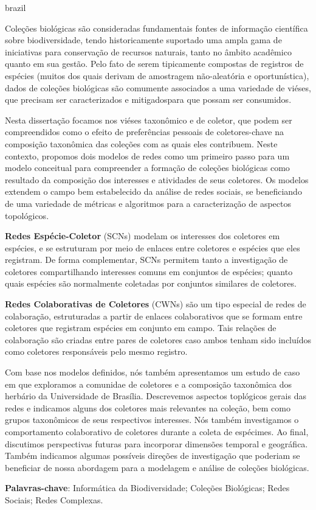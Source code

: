 \documentclass[
	12pt,				%
	openright,			%
	oneside,			%
	a4paper,			%
	sumario=tradicional,%
	french,				%
	spanish,			%
	brazil,				%
    english
	]{abntex2}
\begin{document}
\begin{resumo}[Resumo]
 \begin{otherlanguage*}{brazil}
 \begin{small}
Coleções biológicas são consideradas fundamentais fontes de informação científica sobre biodiversidade, tendo historicamente suportado uma ampla gama de iniciativas para conservação de recursos naturais, tanto no âmbito acadêmico quanto em sua gestão.
Pelo fato de serem tipicamente compostas de registros de espécies (muitos dos quais derivam de amostragem não-aleatória e oportunística), dados de coleções biológicas são comumente associados a uma variedade de viéses, que precisam ser caracterizados e mitigadospara que possam ser consumidos.

Nesta dissertação focamos nos viéses taxonômico e de coletor, que podem ser compreendidos como o efeito de preferências pessoais de coletores-chave na composição taxonômica das coleções com as quais eles contribuem.
Neste contexto, propomos dois modelos de redes como um primeiro passo para um modelo conceitual para compreender a formação de coleções biológicas como resultado da composição dos interesses e atividades de seus coletores.
Os modelos extendem o campo bem estabelecido da análise de redes sociais, se beneficiando de uma variedade de métricas e algoritmos para a caracterização de aspectos topológicos.

\textbf{Redes Espécie-Coletor} (SCNs) modelam os interesses dos coletores em espécies, e se estruturam por meio de enlaces entre coletores e espécies que eles registram.
De forma complementar, SCNs permitem tanto a investigação de coletores compartilhando interesses comuns em conjuntos de espécies; quanto quais espécies são normalmente coletadas por conjuntos similares de coletores.

\textbf{Redes Colaborativas de Coletores} (CWNs) são um tipo especial de redes de colaboração, estruturadas a partir de enlaces colaborativos que se formam entre coletores que registram espécies em conjunto em campo.
Tais relações de colaboração são criadas entre pares de coletores caso ambos tenham sido incluídos como coletores responsáveis pelo mesmo registro.

Com base nos modelos definidos, nós também apresentamos um estudo de caso em que exploramos a comunidae de coletores e a composição taxonômica dos herbário da Universidade de Brasília.
Descrevemos aspectos toplógicos gerais das redes e indicamos alguns dos coletores mais relevantes na coleção, bem como grupos taxonômicos de seus respectivos interesses.
Nós também investigamos o comportamento colaborativo de coletores durante a coleta de espécimes.
Ao final, discutimos perspectivas futuras para incorporar dimensões temporal e geográfica.
Também indicamos algumas possíveis direções de investigação que poderiam se beneficiar de nossa abordagem para a modelagem e análise de coleções biológicas.

\textbf{Palavras-chave}: Informática da Biodiversidade; Coleções Biológicas; Redes Sociais; Redes Complexas.
\end{small}
\end{otherlanguage*}
\end{resumo}
\end{document}
